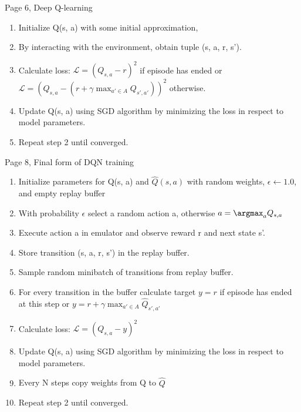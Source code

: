 Page 6, Deep Q-learning


\begin{enumerate}
  \item Initialize Q(s, a) with some initial approximation,
  \item By interacting with the environment, obtain tuple (s, a, r, s').
  \item Calculate loss:
    \begin{math}\mathcal{L} = (Q_{s,a} - r)^2\end{math} if episode has ended or
      \begin{math}\mathcal{L} = (Q_{s,a} - (r + \gamma \max_{a' \in
          A}Q_{s',a'}))^2\end{math} otherwise.
  \item Update Q(s, a) using SGD algorithm by minimizing the loss in respect to model parameters.
  \item Repeat step 2 until converged.
\end{enumerate}

Page 8, Final form of DQN training
\begin{enumerate}
  \item Initialize parameters for Q(s, a) and \begin{math}\hat{Q}(s, a)\end{math} with random
    weights, \begin{math}\epsilon \leftarrow 1.0\end{math}, and empty replay buffer
  \item With probability \begin{math}\epsilon\end{math} select a random action a, otherwise
    \begin{math}a = \argmax_aQ_{s, a}\end{math}
  \item Execute action a in emulator and observe reward r and next state s'.
  \item Store transition (s, a, r, s') in the replay buffer.
  \item Sample random minibatch of transitions from replay buffer.
  \item For every transition in the buffer calculate target \begin{math}y = r\end{math} 
    if episode has ended at this step or
    \begin{math}y = r + \gamma \max_{a' \in A} \hat{Q}_{s',a'}\end{math}
  \item Calculate loss: \begin{math}\mathcal{L} = (Q_{s, a} - y)^2\end{math}
  \item Update Q(s, a) using SGD algorithm by minimizing the loss in respect to model parameters.
  \item Every N steps copy weights from Q to \begin{math}\hat{Q}\end{math}
  \item Repeat step 2 until converged.
\end{enumerate}


